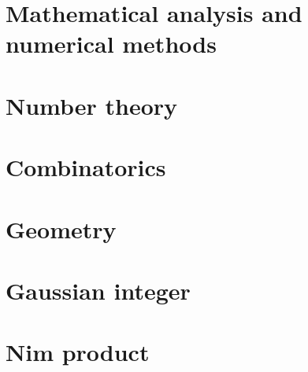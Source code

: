 \section*{Mathematical analysis and numerical methods}
	

\section*{Number theory}
	

\section*{Combinatorics}
	

\section*{Geometry}
	

\section*{Gaussian integer}

\section*{Nim product}
